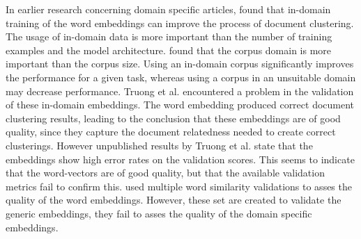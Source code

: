\documentclass[../../Thesis.tex]{subfiles}
\begin{document}
In earlier research concerning domain specific articles,  \citet{Truong2017Thesis} found that in-domain training of the word embeddings can  improve the process of document clustering. The usage of in-domain data is more important than the number of training examples and the model architecture. \citet{lai2016generate} found that the corpus domain is more important than the corpus size. Using an in-domain corpus significantly improves the performance for a given task, whereas using a corpus in an unsuitable domain may decrease performance.
Truong et al. encountered a problem in the validation of these in-domain embeddings. The word embedding produced correct document clustering results, leading to the conclusion that these embeddings are of good quality, since they capture the document relatedness needed to create correct clusterings. However unpublished results by Truong et al. state that the embeddings show high error rates on the validation scores. This seems to indicate that the word-vectors are of good quality, but that the available validation metrics fail to confirm this. \citet{Truong2017Thesis} used multiple word similarity validations to asses the quality of the word embeddings. However, these set are created to validate the generic embeddings, they fail to asses the quality of the domain specific embeddings.
\end{document}
